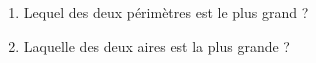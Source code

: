
\begin{mental}

\begin{center}
    
\end{center}

\begin{enumerate}
    \item
        Lequel des deux périmètres est le plus grand ?
    \item
        Laquelle des deux aires est la plus grande ?
\end{enumerate}

\end{mental}
